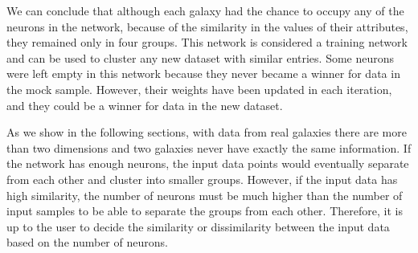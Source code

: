 We can conclude that although each galaxy had the chance to occupy any of the neurons in the network, because of the similarity in the values of their attributes, they remained only in four groups.
This network is considered a training network and can be used to cluster any new dataset with similar entries.
Some neurons were left empty in this network because they never became a winner for data in the mock sample.
However, their weights have been updated in each iteration, and they could be a winner for data in the new dataset.

As we show in the following sections, with data from real galaxies there are more than two dimensions and two galaxies never have exactly the same information. 
If the network has enough neurons, the input data points would eventually separate from each other and cluster into smaller groups. 
However, if the input data has high similarity, the number of neurons must be much higher than the number of input samples to be able to separate the groups from each other. 
Therefore, it is up to the user to decide the similarity or dissimilarity between the input data based on the number of neurons. 
